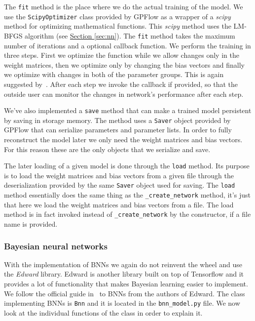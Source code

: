 \documentclass[12pt,a4paper,twoside]{scrartcl}
\numberwithin{equation}{section}
\newcommand{\refsec}[1]{\hyperref[#1]{Section \ref*{#1}}}
\begin{document}
The \texttt{fit} method is the place where we do the actual training of the model. We use the \texttt{ScipyOptimizer} class provided by GPFlow as a wrapper of a \emph{scipy} method for optimizing mathematical functions. This \emph{scipy} method uses the LM-BFGS algorithm (see \refsec{sec:nn}). The \texttt{fit} method takes the maximum number of iterations and a optional callback function. We perform the training in three steps. First we optimize the function while we allow changes only in the weight matrices, then we optimize only by changing the bias vectors and finally we optimize with changes in both of the parameter groups. This is again suggested by~\cite{mdntut}. After each step we invoke the callback if provided, so that the outside user can monitor the changes in network's performance after each step.

We've also implemented a \texttt{save} method that can make a trained model persistent by saving in storage memory. The method uses a \texttt{Saver} object provided by GPFlow that can serialize parameters and parameter lists. In order to fully reconstruct the model later we only need the weight matrices and bias vectors. For this reason these are the only objects that we serialize and save.

The later loading of a given model is done through the \texttt{load} method. Its purpose is to load the weight matrices and bias vectors from a given file through the deserialization provided by the same \texttt{Saver} object used for saving. The \texttt{load} method essentially does the same thing as the \texttt{\_create\_network} method, it's just that here we load the weight matrices and bias vectors from a file. The load method is in fact invoked instead of \texttt{\_create\_network} by the constructor, if a file name is provided.
\subsubsection{Bayesian neural networks}\label{sec:impl-bnn}
With the implementation of BNNs we again do not reinvent the wheel and use the \emph{Edward} library. Edward is another library built on top of Tensorflow and it provides a lot of functionality that makes Bayesian learning easier to implement. We follow the official guide in~\cite{bnntut} to BNNs from the authors of Edward. The class implementing BNNs is \texttt{Bnn} and it is located in the \texttt{bnn\_model.py} file. We now look at the individual functions of the class in order to explain it.
\end{document}
